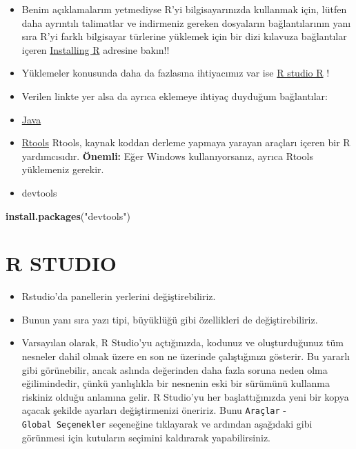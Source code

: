 \documentclass[
  oneside]{book}
\newenvironment{Shaded}{\begin{snugshade}}{\end{snugshade}}
\newcommand{\FunctionTok}[1]{\textcolor[rgb]{0.13,0.29,0.53}{\textbf{#1}}}
\newcommand{\NormalTok}[1]{#1}
\newcommand{\StringTok}[1]{\textcolor[rgb]{0.31,0.60,0.02}{#1}}
\begin{document}
\begin{itemize}
\item
  Benim açıklamalarım yetmediyse R'yi bilgisayarınızda kullanmak için, lütfen daha ayrıntılı talimatlar ve indirmeniz gereken dosyaların bağlantılarının yanı sıra R'yi farklı bilgisayar türlerine yüklemek için bir dizi kılavuza bağlantılar içeren \href{https://psyteachr.github.io/data-skills-v1/installing-r.html}{Installing R} adresine bakın!!
\item
  Yüklemeler konusunda daha da fazlasına ihtiyacımız var ise \href{https://psyteachr.github.io/data-skills-v1/appendix-updating-r.html}{R studio R} !
\item
  Verilen linkte yer alsa da ayrıca eklemeye ihtiyaç duyduğum bağlantılar:
\item
  \href{https://javadl.oracle.com/webapps/download/AutoDL?BundleId=245479_4d5417147a92418ea8b615e228bb6935}{Java}
\item
  \href{https://cloud.r-project.org/bin/windows/Rtools/}{Rtools} Rtools, kaynak koddan derleme yapmaya yarayan araçları içeren bir R yardımcısıdır. \textbf{Önemli:} Eğer Windows kullanıyorsanız, ayrıca Rtools yüklemeniz gerekir.
\item
  devtools
\end{itemize}

\begin{Shaded}
\begin{Highlighting}[]
\FunctionTok{install.packages}\NormalTok{(}\StringTok{"devtools"}\NormalTok{)}
\end{Highlighting}
\end{Shaded}

\hypertarget{r-studio}{%
\section{R STUDIO}\label{r-studio}}

\begin{itemize}
\item
  Rstudio'da panellerin yerlerini değiştirebiliriz.
\item
  Bunun yanı sıra yazı tipi, büyüklüğü gibi özellikleri de değiştirebiliriz.
\item
  Varsayılan olarak, R Studio'yu açtığınızda, kodunuz ve oluşturduğunuz tüm nesneler dahil olmak üzere en son ne üzerinde çalıştığınızı gösterir. Bu yararlı gibi görünebilir, ancak aslında değerinden daha fazla soruna neden olma eğilimindedir, çünkü yanlışlıkla bir nesnenin eski bir sürümünü kullanma riskiniz olduğu anlamına gelir. R Studio'yu her başlattığınızda yeni bir kopya açacak şekilde ayarları değiştirmenizi öneririz. Bunu \texttt{Araçlar} - \texttt{Global\ Seçenekler} seçeneğine tıklayarak ve ardından aşağıdaki gibi görünmesi için kutuların seçimini kaldırarak yapabilirsiniz.
\end{itemize}
\end{document}

